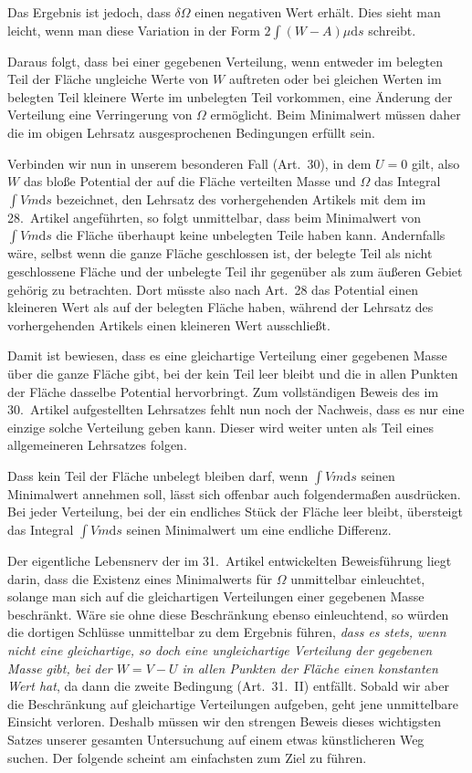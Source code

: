 Das Ergebnis ist jedoch, dass $\delta\Omega$ einen negativen Wert erhält. Dies sieht man leicht, wenn man diese Variation in der Form $2\int(W-A)\mu\mathrm ds$ schreibt.

Daraus folgt, dass bei einer gegebenen Verteilung, wenn entweder im belegten Teil der Fläche ungleiche Werte von $W$ auftreten oder bei gleichen Werten im belegten Teil kleinere Werte im unbelegten Teil vorkommen, eine Änderung der Verteilung eine Verringerung von $\Omega$ ermöglicht. Beim Minimalwert müssen daher die im obigen Lehrsatz ausgesprochenen Bedingungen erfüllt sein.

Verbinden wir nun in unserem besonderen Fall (Art.\ 30), in dem $U=0$ gilt, also $W$ das bloße Potential der auf die Fläche verteilten Masse und $\Omega$ das Integral $\int Vm\mathrm ds$ bezeichnet, den Lehrsatz des vorhergehenden Artikels mit dem im 28.\ Artikel angeführten, so folgt unmittelbar, dass beim Minimalwert von $\int Vm\mathrm ds$ die Fläche überhaupt keine unbelegten Teile haben kann. Andernfalls wäre, selbst wenn die ganze Fläche geschlossen ist, der belegte Teil als nicht geschlossene Fläche und der unbelegte Teil ihr gegenüber als zum äußeren Gebiet gehörig zu betrachten. Dort müsste also nach Art.\ 28 das Potential einen kleineren Wert als auf der belegten Fläche haben, während der Lehrsatz des vorhergehenden Artikels einen kleineren Wert ausschließt.

Damit ist bewiesen, dass es eine gleichartige Verteilung einer gegebenen Masse über die ganze Fläche gibt, bei der kein Teil leer bleibt und die in allen Punkten der Fläche dasselbe Potential hervorbringt. Zum vollständigen Beweis des im 30.\ Artikel aufgestellten Lehrsatzes fehlt nun noch der Nachweis, dass es nur eine einzige solche Verteilung geben kann. Dieser wird weiter unten als Teil eines allgemeineren Lehrsatzes folgen.

Dass kein Teil der Fläche unbelegt bleiben darf, wenn $\int Vm\mathrm ds$ seinen Minimalwert annehmen soll, lässt sich offenbar auch folgendermaßen ausdrücken.
Bei jeder Verteilung, bei der ein endliches Stück der Fläche leer bleibt, übersteigt das Integral $\int Vm\mathrm ds$ seinen Minimalwert um eine endliche Differenz.

Der eigentliche Lebensnerv der im 31.\ Artikel entwickelten Beweisführung liegt darin, dass die Existenz eines Minimalwerts für $\Omega$ unmittelbar einleuchtet, solange man sich auf die gleichartigen Verteilungen einer gegebenen Masse beschränkt. Wäre sie ohne diese Beschränkung ebenso einleuchtend, so würden die dortigen Schlüsse unmittelbar zu dem Ergebnis führen, \textit{dass es stets, wenn nicht eine gleichartige, so doch eine ungleichartige Verteilung der gegebenen Masse gibt, bei der $W=V-U$ in allen Punkten der Fläche einen konstanten Wert hat}, da dann die zweite Bedingung (Art.\ 31.\ II) entfällt. Sobald wir aber die Beschränkung auf gleichartige Verteilungen aufgeben, geht jene unmittelbare Einsicht verloren. Deshalb müssen wir den strengen Beweis dieses wichtigsten Satzes unserer gesamten Untersuchung auf einem etwas künstlicheren Weg suchen. Der folgende scheint am einfachsten zum Ziel zu führen.

